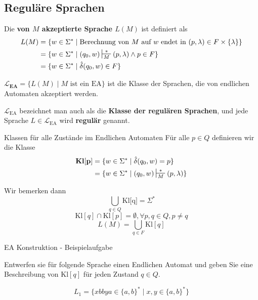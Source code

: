 \subsection{Reguläre Sprachen}

Die \textbf{von $M$ akzeptierte Sprache $L(M)$} ist definiert als
\begin{align*}
    L(M) &= \{w \in \Sigma^* \mid \text{Berechnung von }M \text{ auf } w \text{ endet in } (p, \lambda) \in F \times \{\lambda \}\}\\
    &= \{w \in \Sigma^* \mid (q_0, w)\sststile{M}{*}(p, \lambda) \land p \in F\}\\
    &= \{w \in \Sigma^* \mid \hat{\delta}(q_0, w) \in F\}
\end{align*}
\begin{mainbox}{}
    $\mathbf{\mathcal{L}_{\textbf{EA}}} = \{L(M) \mid M \text{ ist ein EA}\}$ ist die Klasse der Sprachen, die von endlichen Automaten akzeptiert werden.

    $\mathcal{L}_{\text{EA}}$ bezeichnet man auch als die \textbf{Klasse der regulären Sprachen}, und jede Sprache $L \in \mathcal{L}_{\text{EA}}$ wird \textbf{regulär} genannt.
\end{mainbox}

\begin{mainbox}{Klassen für alle Zustände im Endlichen Automaten}
    Für alle $p \in Q$ definieren wir die Klasse
    \begin{align*}
        \textbf{Kl}\mathbf{[p]} &= \{w \in \Sigma^* \mid \hat{\delta}(q_0, w) = p\}\\
        &= \{w \in \Sigma^* \mid (q_0, w) \sststile{M}{*}(p, \lambda)\}
    \end{align*}
\end{mainbox}
Wir bemerken dann
$$\bigcup_{q \in Q}\text{Kl[q]} = \Sigma^*$$
$$\text{Kl}[q] \cap \text{Kl}[p] = \emptyset, \forall p, q \in Q, p \neq q$$
$$L(M) = \bigcup_{q \in F}\text{Kl}[q]$$





\begin{subbox}{EA Konstruktion - Beispielaufgabe}

Entwerfen sie für folgende Sprache einen Endlichen Automat und geben Sie eine Beschreibung von Kl$[q]$ für jeden Zustand $q \in Q$.

$$L_1 = \{xbbya \in \{a, b\}^* \mid x,y \in \{a, b\}^*\}$$
\end{subbox}

